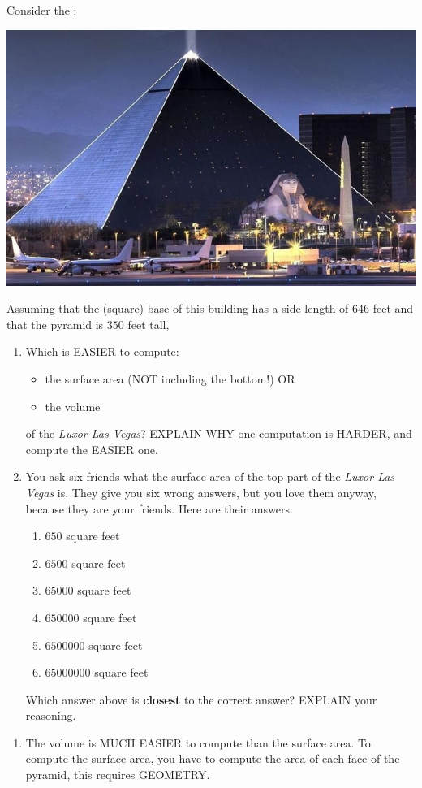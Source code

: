 \documentclass[nooutcomes,noauthor,hints]{ximera}
\begin{document}
\begin{question}
  Consider the :
  \begin{center}
    \includegraphics[width=.4\textwidth]{pyramid.jpg} 
  \end{center}
 Assuming that the (square) base of this building has a side length of
 $646$ feet and that the pyramid is $350$ feet tall,
  \begin{enumerate}
  \item Which is EASIER to compute:
    \begin{itemize}
    \item the surface area (NOT including the bottom!) OR
    \item the volume
    \end{itemize}
    of the \textit{Luxor Las Vegas}? EXPLAIN WHY one computation is
    HARDER, and compute the EASIER one.
  \item %

    You ask six friends what the surface area of the top part of the
    \textit{Luxor Las Vegas} is. They give you six wrong answers, but
    you love them anyway, because they are your friends. Here are
    their answers:
    \begin{enumerate}
    \item $650$ square feet
    \item $6500$ square feet
    \item $65000$ square feet
    \item $650000$ square feet
    \item $6500000$ square feet
    \item $65000000$ square feet
    \end{enumerate}
    Which answer above is \textbf{closest} to the correct answer? EXPLAIN your reasoning.
  \end{enumerate}
  \begin{freeResponse}
    \begin{enumerate}
      \item The volume is MUCH EASIER to compute than the surface
        area. To compute the surface area, you have to compute the
        area of each face of the pyramid, this requires GEOMETRY.


\end{enumerate}
\end{freeResponse}
\end{question}
\end{document}
